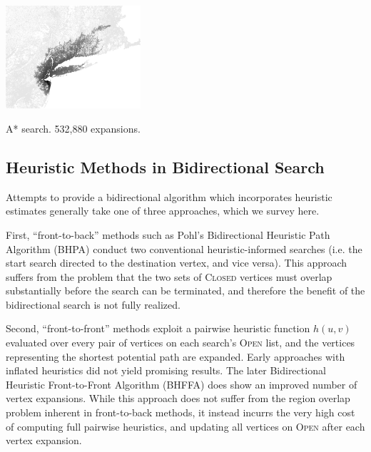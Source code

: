 \begin{marginfigure}%
   \centering%
   \includegraphics[width=5cm]{figs/incbi-road-ne/singleshot/example-astar.png}%
   \caption{A* search.
      532,880 expansions.}%
   \label{fig:ibid:example-astar}%
\end{marginfigure}

\subsection{Heuristic Methods in Bidirectional Search}
\label{subsec:ibid:heuristic-bidirectional}

Attempts to provide a bidirectional algorithm which incorporates
heuristic estimates generally take one of three approaches,
which we survey here.

First,
``front-to-back'' methods
such as Pohl's Bidirectional Heuristic Path Algorithm (BHPA)
\citep{pohl1971bidirectional}
conduct two conventional heuristic-informed searches
(i.e. the start search directed to the destination vertex,
and vice versa).
This approach suffers from the problem that the two sets of
\textsc{Closed} vertices must overlap substantially
before the search can be terminated,
and therefore the benefit of the bidirectional search
is not fully realized.

Second,
``front-to-front'' methods exploit a pairwise
heuristic function $h(u,v)$ evaluated over every pair of vertices
on each search's \textsc{Open} list,
and the vertices representing the shortest potential path are
expanded.
Early approaches with inflated heuristics
\citep{doran1966doubletree} did not yield promising results.
The later Bidirectional Heuristic Front-to-Front Algorithm
(BHFFA) \citep{champeaux1983biheuragain} does show an improved
number of vertex expansions.
While this approach does not suffer from the region overlap problem
inherent in front-to-back methods,
it instead incurrs the very high cost of computing full pairwise
heuristics, and updating all vertices on \textsc{Open}
after each vertex expansion.

